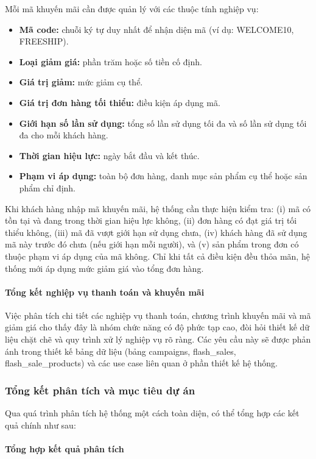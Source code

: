 \documentclass[13pt]{article}
\begin{document}
Mỗi mã khuyến mãi cần được quản lý với các thuộc tính nghiệp vụ:
\begin{itemize}
    \item \textbf{Mã code:} chuỗi ký tự duy nhất để nhận diện mã (ví dụ: WELCOME10, FREESHIP).
    \item \textbf{Loại giảm giá:} phần trăm hoặc số tiền cố định.
    \item \textbf{Giá trị giảm:} mức giảm cụ thể.
    \item \textbf{Giá trị đơn hàng tối thiểu:} điều kiện áp dụng mã.
    \item \textbf{Giới hạn số lần sử dụng:} tổng số lần sử dụng tối đa và số lần sử dụng tối đa cho mỗi khách hàng.
    \item \textbf{Thời gian hiệu lực:} ngày bắt đầu và kết thúc.
    \item \textbf{Phạm vi áp dụng:} toàn bộ đơn hàng, danh mục sản phẩm cụ thể hoặc sản phẩm chỉ định.
\end{itemize}

Khi khách hàng nhập mã khuyến mãi, hệ thống cần thực hiện kiểm tra: (i) mã có tồn tại và đang trong thời gian hiệu lực không, (ii) đơn hàng có đạt giá trị tối thiểu không, (iii) mã đã vượt giới hạn sử dụng chưa, (iv) khách hàng đã sử dụng mã này trước đó chưa (nếu giới hạn mỗi người), và (v) sản phẩm trong đơn có thuộc phạm vi áp dụng của mã không. Chỉ khi tất cả điều kiện đều thỏa mãn, hệ thống mới áp dụng mức giảm giá vào tổng đơn hàng.

\paragraph{Tổng kết nghiệp vụ thanh toán và khuyến mãi}
Việc phân tích chi tiết các nghiệp vụ thanh toán, chương trình khuyến mãi và mã giảm giá cho thấy đây là nhóm chức năng có độ phức tạp cao, đòi hỏi thiết kế dữ liệu chặt chẽ và quy trình xử lý nghiệp vụ rõ ràng. Các yêu cầu này sẽ được phản ánh trong thiết kế bảng dữ liệu (bảng campaigns, flash\_sales, flash\_sale\_products) và các use case liên quan ở phần thiết kế hệ thống.

\subsubsection{Tổng kết phân tích và mục tiêu dự án}

Qua quá trình phân tích hệ thống một cách toàn diện, có thể tổng hợp các kết quả chính như sau:

\paragraph{Tổng hợp kết quả phân tích}
\end{document}
